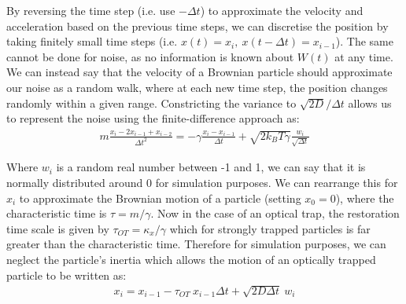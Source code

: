 By reversing the time step (i.e. use $-\Delta t$) to approximate 
the velocity and acceleration based on the previous time steps, 
we can discretise the position by taking finitely small  time 
steps (i.e. $x(t) = x_i,\ x(t-\Delta t) = x_{i-1}$). The same 
cannot be done for noise, as no information is known about $W(t)$ 
at any time. We can instead say that the velocity of a Brownian 
particle should approximate our noise as a random walk, where at 
each new time step, the position changes randomly within a given 
range. Constricting the variance to $\sqrt{2D}/\Delta t$ allows 
us to represent the noise using the finite-difference approach as:
\begin{align}
	m\frac{x_i-2x_{i-1}+x_{i-2}}{\Delta t^2} = -\gamma\frac{x_i-x_{i-1}}{\Delta t}+\sqrt{2k_BT\gamma}\frac{w_i}{\sqrt{\Delta t}}
\end{align}

Where $w_i$ is a random real number between -1 and 1, we can say 
that it is normally distributed around 0 for simulation purposes. 
We can rearrange this for $x_i$ to approximate the Brownian motion 
of a particle (setting $x_0=0$), where the characteristic time is 
$\tau = m/\gamma$. Now in the case of an optical trap, the 
restoration time scale is given by $\tau_{OT}=\kappa_x/\gamma$ 
which for strongly trapped particles is far greater than the 
characteristic time. Therefore for simulation purposes, we can 
neglect the particle's inertia which allows the motion of an 
optically trapped particle to be written as:
\begin{align}
	\label{eq:sim_langevin}
	x_i = x_{i-1} - \tau_{OT}\ x_{i-1}\Delta t + \sqrt{2D\Delta t}\ w_i
\end{align} 

